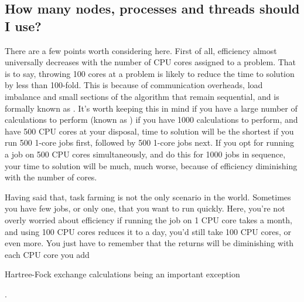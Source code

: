 \documentclass[letterpaper,10pt,english]{sphinxmanual}
\begin{document}
\subsection{How many nodes, processes and threads should I use?}
\label{\detokenize{starting_with_onetep:how-many-nodes-processes-and-threads-should-i-use}}
There are a few points worth considering here. First of all, efficiency
almost universally decreases with the number of CPU cores assigned to a
problem. That is to say, throwing 100 cores at a problem is likely to
reduce the time to solution by less than 100-fold. This is because of
communication overheads, load imbalance and small sections of the
algorithm that remain sequential, and is formally known as . It’s worth
keeping this in mind if you have a large number of calculations to
perform (known as ) \textendash{} if you have 1000 calculations to
perform, and have 500 CPU cores at your disposal, time to solution will
be the shortest if you run 500 1-core jobs first, followed by 500 1-core
jobs next. If you opt for running a job on 500 CPU cores simultaneously,
and do this for 1000 jobs in sequence, your time to solution will be
much, much worse, because of efficiency diminishing with the number of
cores.

Having said that, task farming is not the only scenario in the world.
Sometimes you have few jobs, or only one, that you want to run quickly.
Here, you’re not overly worried about efficiency \textendash{} if running the job on
1 CPU core takes a month, and using 100 CPU cores reduces it to a day,
you’d still take 100 CPU cores, or even more. You just have to remember
that the returns will be diminishing with each CPU core you add %
\begin{footnote}[1]\sphinxAtStartFootnote
Hartree-Fock exchange calculations being an important exception
%
\end{footnote}.
\end{document}
